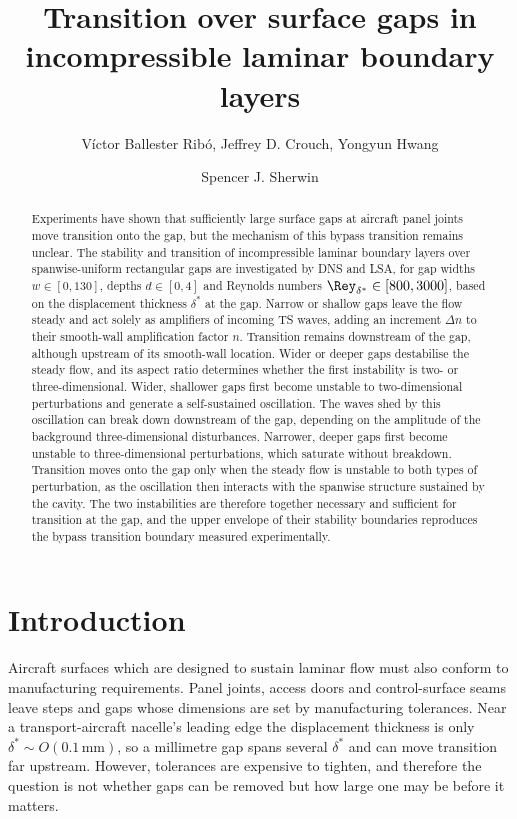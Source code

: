 \documentclass[lineno]{jfm}
\title{Transition over surface gaps in incompressible laminar boundary layers}
\author{Víctor Ballester Ribó\aff{1}, Jeffrey D. Crouch\aff{2}, Yongyun Hwang\aff{1} \and Spencer J. Sherwin\aff{1}}
\affiliation{\aff{1}Department of Aeronautics, Imperial College London, South Kensington, London SW7 2AZ, UK
\aff{2}The Boeing Company, P.O. Box 3707, Seattle, WA 98124-2207, USA}
\newcommand\dstar{{\delta^*}} %
\begin{document}
\LineNumberstrue
\maketitle

\begin{abstract}
	Experiments have shown that sufficiently large surface gaps at aircraft panel joints move transition onto the gap, but the mechanism of this bypass transition remains unclear. The stability and transition of incompressible laminar boundary layers over spanwise-uniform rectangular gaps are investigated by \acl{DNS} and \acl{LSA}, for gap widths $w\in[0,130]$, depths $d\in[0,4]$ and Reynolds numbers $\Rey_\dstar\in[800,3000]$, based on the displacement thickness $\dstar$ at the gap. Narrow or shallow gaps leave the flow steady and act solely as amplifiers of incoming \acl{TS} waves, adding an increment $\Delta n$ to their smooth-wall amplification factor $n$. Transition remains downstream of the gap, although upstream of its smooth-wall location. Wider or deeper gaps destabilise the steady flow, and its aspect ratio determines whether the first instability is two- or three-dimensional. Wider, shallower gaps first become unstable to two-dimensional perturbations and generate a self-sustained oscillation. The waves shed by this oscillation can break down downstream of the gap, depending on the amplitude of the background three-dimensional disturbances. Narrower, deeper gaps first become unstable to three-dimensional perturbations, which saturate without breakdown. Transition moves onto the gap only when the steady flow is unstable to both types of perturbation, as the oscillation then interacts with the spanwise structure sustained by the cavity. The two instabilities are therefore together necessary and sufficient for transition at the gap, and the upper envelope of their stability boundaries reproduces the bypass transition boundary measured experimentally.
\end{abstract}

\acresetall

\section{Introduction}\label{sec:introduction}
Aircraft surfaces which are designed to sustain laminar flow must also conform to manufacturing requirements. Panel joints, access doors and control-surface seams leave steps and gaps whose dimensions are set by manufacturing tolerances. Near a transport-aircraft nacelle's leading edge the displacement thickness is only $\dstar\sim O(0.1\,\mathrm{mm})$, so a millimetre gap spans several $\dstar$ and can move transition far upstream. However, tolerances are expensive to tighten, and therefore the question is not whether gaps can be removed but how large one may be before it matters.
\end{document}
